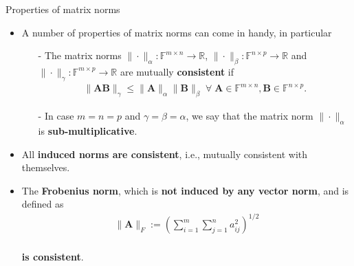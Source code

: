 \documentclass[t,usepdftitle=false]{beamer}
\begin{document}
\begin{frame}{Properties of matrix norms}
\begin{itemize} 
\item A number of properties of matrix norms can come in handy, in particular
\begin{definition}
\begin{itemize}
\item[-]The matrix norms $\|\cdot\|_\alpha:\mathbb{F}^{m\times n}\rightarrow \mathbb{R}$,
$\|\cdot\|_\beta:\mathbb{F}^{n\times p}\rightarrow \mathbb{R}$ and
$\|\cdot\|_\gamma:\mathbb{F}^{m\times p}\rightarrow \mathbb{R}$ are mutually \textbf{consistent} if
\begin{align*}
\|\mathbf{A}\mathbf{B}\|_\gamma\leq\|\mathbf{A}\|_\alpha\|\mathbf{B}\|_\beta\;\forall\;\mathbf{A}\in\mathbb{F}^{m\times n},\mathbf{B}\in\mathbb{F}^{n\times p}.
\end{align*}
\item[-] In case $m=n=p$ and $\gamma=\beta=\alpha$, we say that the matrix norm $\|\cdot\|_\alpha$ is \textbf{sub-multiplicative}.
\end{itemize}
\end{definition}
\item All \textbf{induced norms are consistent}, i.e., mutually consistent with themselves.
\item The \textbf{Frobenius norm}, which is \textbf{not induced by any vector norm}, and is defined as\vspace{-.3cm}
\begin{align*}
\|\mathbf{A}\|_F:=\left(\sum_{i=1}^m\sum_{j=1}^n a_{ij}^2\right)^{1/2}
\end{align*}
\vspace{-.4cm}\\
\textbf{is consistent}.
\end{itemize}
\end{frame}
\end{document}
